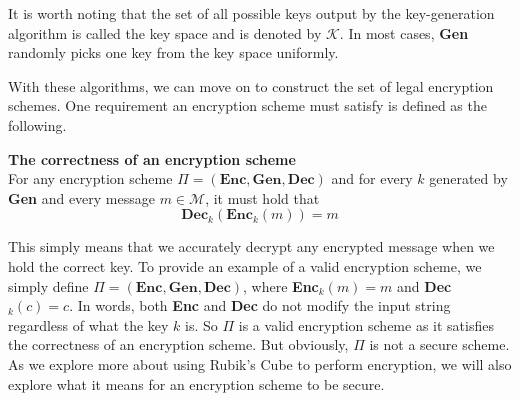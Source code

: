 \par It is worth noting that the set of all possible keys output by the key-generation algorithm is called the key space and is denoted by $\mathcal{K}$. In most cases, \textbf{Gen} randomly picks one key from the key space uniformly.
\par With these algorithms, we can move on to construct the set of legal encryption schemes. One requirement an encryption scheme must satisfy is defined as the following.
\begin{definition} \textbf{The correctness of an encryption scheme} \\
    For any encryption scheme $\Pi = (\textbf{Enc}, \textbf{Gen}, \textbf{Dec})$ and for every $k$ generated by \textbf{Gen} and every message $m \in \mathcal{M}$, it must hold that \[\textbf{Dec}_k(\textbf{Enc}_k(m)) = m\]
\end{definition}
\par This simply means that we accurately decrypt any encrypted message when we hold the correct key. To provide an example of a valid encryption scheme, we simply define $\Pi = (\textbf{Enc}, \textbf{Gen}, \textbf{Dec})$, where \textbf{Enc}$_k(m) = m$ and \textbf{Dec}$_k(c) = c$. In words, both \textbf{Enc} and \textbf{Dec} do not modify the input string regardless of what the key $k$ is. So $\Pi$ is a valid encryption scheme as it satisfies the correctness of an encryption scheme. But obviously, $\Pi$ is not a secure scheme. As we explore more about using Rubik's Cube to perform encryption, we will also explore what it means for an encryption scheme to be secure.
